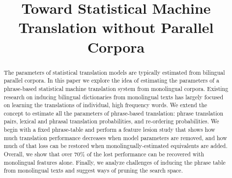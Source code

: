 \documentclass[11pt]{article}
\title{Toward Statistical Machine Translation without Parallel Corpora}
\author{}
\date{}
\begin{document}
\maketitle
\begin{abstract}
The parameters of statistical translation models are typically estimated from bilingual parallel corpora.   In this paper we explore the idea of estimating the parameters of a phrase-based statistical machine translation system from monolingual corpora.  Existing research on inducing bilingual dictionaries from monolingual texts has largely focused on learning the translations of individual, high frequency words.   We extend the concept to estimate all the parameters of phrase-based translation: phrase translation pairs, lexical and phrasal translation probabilities, and re-ordering probabilities.  We begin with a fixed phrase-table and perform a feature lesion study that shows how much translation performance decreases when model parameters are removed, and how much of that loss can be restored when monolingually-estimated equivalents are added.  Overall, we show that over 70\% of the lost performance can be recovered with monolingual features alone.  Finally, we analyze challenges of inducing the phrase table from monolingual texts and suggest ways of pruning the search space.  



\end{abstract}
\end{document}
